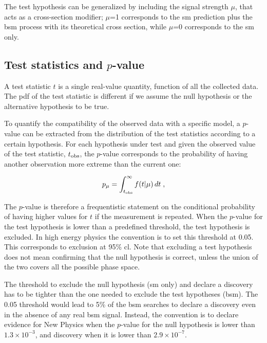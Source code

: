 \noindent The test hypothesis can be generalized by including the signal strength $\mu$, that acts as a cross-section modifier; $\mu$=1 corresponds to the \gls{sm} prediction plus the \gls{bsm} process with its theoretical cross section, while $\mu$=0 corresponds to the \gls{sm} only.

\subsection{Test statistics and $p$-value}

 A test statistic $t$ is a single real-value quantity, function of all the collected data. The \gls{pdf} of the test statistic is different if we assume the null hypothesis or the alternative hypothesis to be true.

To quantify the compatibility of the observed data with a specific model, a $p$-value can be extracted from the distribution of the test statistics according to a certain hypothesis. For each hypothesis under test and given the observed value of the test statistic, $t_{{\rm obs}}$, the $p$-value corresponds to the probability of having another observation more extreme than the current one:

\begin{equation}
\label{eq:stat:pval}
p_{\mu} = \int_{t_{{\rm obs}}}^{\infty} f(t | \mu ) \,
d t \; ,
\end{equation}

The $p$-value is therefore a frequentistic statement on the conditional probability of having higher values for $t$ if the measurement is repeated. When the $p$-value for the test hypothesis is lower than a predefined threshold, the test hypothesis is excluded. In high energy physics the convention is to set this threshold at 0.05. This corresponds to exclusion at 95\% \gls{cl}. Note that excluding a test hypothesis does not mean confirming that the null hypothesis is correct, unless the union of the two covers all the possible phase space.

The threshold to exclude the null hypothesis (\gls{sm} only) and declare a discovery has to be tighter than the one needed to exclude the test hypotheses (\gls{bsm}). The 0.05 threshold would lead to 5\% of the \gls{bsm} searches to declare a discovery even in the absence of any real \gls{bsm} signal. Instead, the convention is to declare evidence for New Physics when the $p$-value for the null hypothesis is lower than $1.3 \times 10^{-3}$, and discovery when it is lower than $2.9 \times 10^{-7}$.

